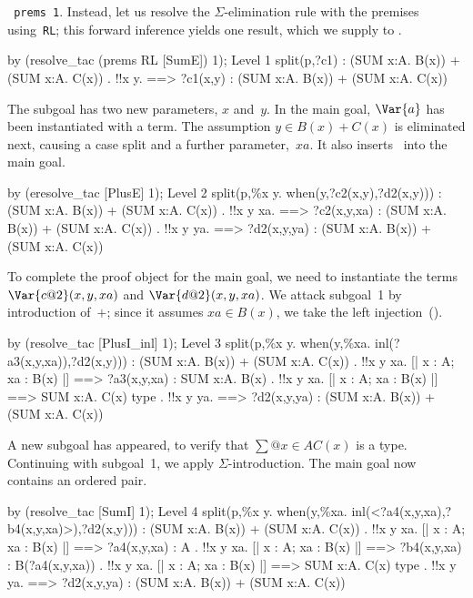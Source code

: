 \hbox{\tt {} prems 1}.   Instead, let us resolve the
$\Sigma$-elimination rule with the premises using~{\tt RL}; this forward
inference yields one result, which we supply to
. 
\begin{ttbox}
by (resolve_tac (prems RL [SumE]) 1);
{\out Level 1}
{\out split(p,?c1) : (SUM x:A. B(x)) + (SUM x:A. C(x))}
{. !!x y.}
{\out        [| x : A; y : B(x) + C(x) |] ==>}
{\out        ?c1(x,y) : (SUM x:A. B(x)) + (SUM x:A. C(x))}
\end{ttbox}
The subgoal has two new parameters, $x$ and~$y$.  In the main goal,
$\Var{a}$ has been instantiated with a  term.  The
assumption $y\in B(x) + C(x)$ is eliminated next, causing a case split and
a further parameter,~$xa$.  It also inserts~ into the main goal.
\begin{ttbox}
by (eresolve_tac [PlusE] 1);
{\out Level 2}
{\out split(p,\%x y. when(y,?c2(x,y),?d2(x,y)))}
{\out : (SUM x:A. B(x)) + (SUM x:A. C(x))}
{. !!x y xa.}
{\out        [| x : A; xa : B(x) |] ==>}
{\out        ?c2(x,y,xa) : (SUM x:A. B(x)) + (SUM x:A. C(x))}
\ttbreak
{. !!x y ya.}
{\out        [| x : A; ya : C(x) |] ==>}
{\out        ?d2(x,y,ya) : (SUM x:A. B(x)) + (SUM x:A. C(x))}
\end{ttbox}
To complete the proof object for the main goal, we need to instantiate the
terms $\Var{c@2}(x,y,xa)$ and $\Var{d@2}(x,y,xa)$.  We attack subgoal~1 by
introduction of~$+$; since it assumes $xa\in B(x)$, we take the left
injection~().
\begin{ttbox}
by (resolve_tac [PlusI_inl] 1);
{\out Level 3}
{\out split(p,\%x y. when(y,\%xa. inl(?a3(x,y,xa)),?d2(x,y)))}
{\out : (SUM x:A. B(x)) + (SUM x:A. C(x))}
{. !!x y xa. [| x : A; xa : B(x) |] ==> ?a3(x,y,xa) : SUM x:A. B(x)}
{. !!x y xa. [| x : A; xa : B(x) |] ==> SUM x:A. C(x) type}
\ttbreak
{. !!x y ya.}
{\out        [| x : A; ya : C(x) |] ==>}
{\out        ?d2(x,y,ya) : (SUM x:A. B(x)) + (SUM x:A. C(x))}
\end{ttbox}
A new subgoal has appeared, to verify that $\sum@{x\in A}C(x)$ is a type.
Continuing with subgoal~1, we apply $\Sigma$-introduction.  The main goal
now contains an ordered pair.
\begin{ttbox}
by (resolve_tac [SumI] 1);
{\out Level 4}
{\out split(p,\%x y. when(y,\%xa. inl(<?a4(x,y,xa),?b4(x,y,xa)>),?d2(x,y)))}
{\out : (SUM x:A. B(x)) + (SUM x:A. C(x))}
{. !!x y xa. [| x : A; xa : B(x) |] ==> ?a4(x,y,xa) : A}
{. !!x y xa. [| x : A; xa : B(x) |] ==> ?b4(x,y,xa) : B(?a4(x,y,xa))}
{. !!x y xa. [| x : A; xa : B(x) |] ==> SUM x:A. C(x) type}
{. !!x y ya.}
{\out        [| x : A; ya : C(x) |] ==>}
{\out        ?d2(x,y,ya) : (SUM x:A. B(x)) + (SUM x:A. C(x))}
\end{ttbox}
